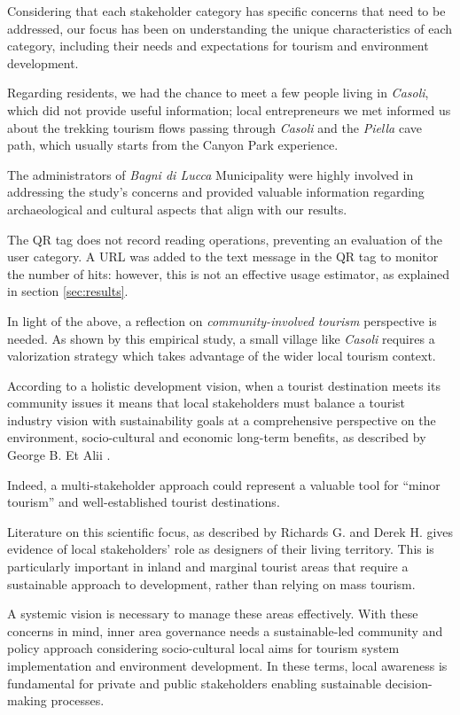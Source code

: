\documentclass[sustainability,article,submit,pdftex,moreauthors]{Definitions/mdpi}
\begin{document}
Considering that each stakeholder category has specific concerns that need to be addressed, our focus has been on understanding the unique characteristics of each category, including their needs and expectations for tourism and environment development. 

Regarding residents, we had the chance to meet a few people living in \emph{Casoli}, which did not provide useful information; local entrepreneurs we met informed us about the trekking tourism flows passing through \emph{Casoli} and the \emph{Piella} cave path, which usually starts from the Canyon Park experience.

The administrators of \emph{Bagni di Lucca} Municipality were highly involved in addressing the study's concerns and provided valuable information regarding archaeological and cultural aspects that align with our results. 

The QR tag does not record reading operations, preventing an evaluation of the user category. A URL was added to the text message in the QR tag to monitor the number of hits: however, this is not an effective usage estimator, as explained in section \ref{sec:results}. 

In light of the above, a reflection on \textit{community-involved tourism} perspective is needed. As shown by this empirical study, a small village like \emph{Casoli} requires a valorization strategy which takes advantage of the wider local tourism context. 

According to a holistic development vision, when a tourist destination meets its community issues it means that local stakeholders must balance a tourist industry vision with sustainability goals at a comprehensive perspective on the environment, socio-cultural and economic long-term benefits, as described by George B. Et Alii \cite {geo07}. 

Indeed,  a multi-stakeholder approach could represent a valuable tool for “minor tourism” and well-established tourist destinations. 

Literature on this scientific focus, as described by Richards G. and Derek H. \cite {ric03} gives evidence of local stakeholders' role as designers of their living territory. This is particularly important in inland and marginal tourist areas that require a sustainable approach to development, rather than relying on mass tourism. 

A systemic vision is necessary to manage these areas effectively. With these concerns in mind, inner area governance needs a sustainable-led community and policy approach considering socio-cultural local aims for tourism system implementation and environment development. 
In these terms, local awareness is fundamental for private and public stakeholders enabling sustainable decision-making processes. 
\end{document}
